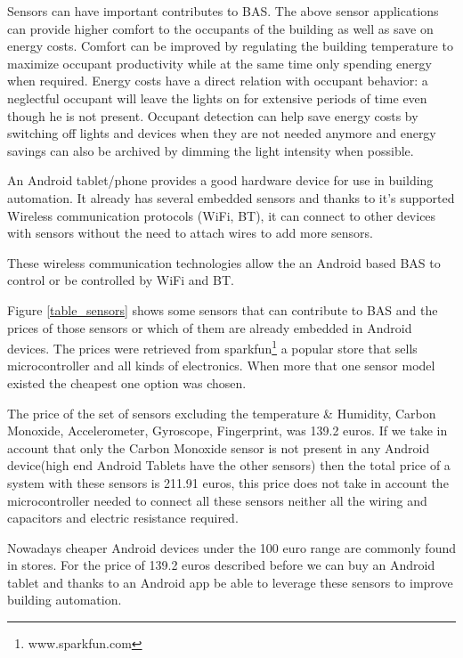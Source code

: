 Sensors can have important contributes to \ac{BAS}. The above sensor applications can provide higher comfort to the occupants of the building as well as save on energy costs. Comfort can be improved by regulating the building temperature to maximize occupant productivity while at the same time only spending energy when required. Energy costs have a direct relation with occupant behavior: a neglectful occupant will leave the lights on for extensive periods of time even though he is not present. Occupant detection can help save energy costs by switching off lights and devices when they are not needed anymore and energy savings can also be archived by dimming the light intensity when possible. 

An Android tablet/phone provides a good hardware device for use in building automation. It already has several embedded sensors  and thanks to it's supported Wireless communication protocols (\ac{WiFi}, \ac{BT}), it can connect to other devices with sensors without the need to attach wires to add more sensors. 

These wireless communication technologies allow the an Android based BAS to control or be controlled by \ac{WiFi} and \ac{BT}.

Figure \ref{table_sensors} shows some sensors that can contribute to BAS and the prices of those sensors or which of them are already embedded in Android devices. The prices were retrieved from sparkfun\footnote{www.sparkfun.com} a popular store that sells microcontroller and all kinds of electronics. When more that one sensor model existed the cheapest one option was chosen.

The price of the  set of sensors excluding the temperature \& Humidity, Carbon Monoxide, Accelerometer, Gyroscope, Fingerprint, was 139.2 euros. If we take in account that only the Carbon Monoxide sensor is not present in any Android device(high end Android Tablets have the other sensors) then the total price of a system with these sensors is 211.91 euros, this price does not take in account the microcontroller needed to connect all these sensors neither all the wiring and capacitors and electric resistance required.

Nowadays cheaper Android devices under the 100 euro range are commonly found in stores. For the price of 139.2 euros described before we can buy an Android tablet and thanks to an Android app be able to leverage these sensors to improve building automation.

